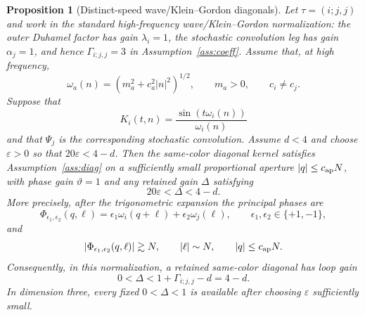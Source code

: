 \documentclass[11pt,reqno]{amsart}
\numberwithin{equation}{section}
\theoremstyle{plain}
\newtheorem{proposition}[theorem]{Proposition}
\theoremstyle{definition}
\newcommand{\eps}{\varepsilon}
\begin{document}
\begin{proposition}[Distinct-speed wave/Klein--Gordon diagonals]\label{prop:wave-verification}
Let \(\tau=(i;j,j)\) and work in the standard high-frequency wave/Klein--Gordon normalization: the outer Duhamel factor has gain \(\lambda_i=1\), the stochastic convolution leg has gain \(\alpha_j=1\), and hence \(\Gamma_{i;j,j}=3\) in Assumption~\ref{ass:coeff}.  Assume that, at high frequency,
\[
        \omega_a(n)=(m_a^2+c_a^2|n|^2)^{1/2},
        \qquad m_a>0,
        \qquad c_i\ne c_j .
\]
Suppose that
\[
        K_i(t,n)=\frac{\sin(t\omega_i(n))}{\omega_i(n)}
\]
and that \(\Psi_j\) is the corresponding stochastic convolution.  Assume
\(d<4\) and choose \(\eps>0\) so that \(20\eps<4-d\).  Then the same-color
diagonal kernel satisfies Assumption~\ref{ass:diag} on a sufficiently small
proportional aperture \(|q|\le c_{\rm ap}N\), with phase gain \(\vartheta=1\)
and any retained gain \(\Delta\) satisfying
\[
        20\eps<\Delta<4-d.
\]
More precisely, after the trigonometric expansion the principal phases are
\begin{equation}\label{eq:wave-phases}
        \Phi_{\epsilon_1,\epsilon_2}(q,\ell)
        =\epsilon_1\omega_i(q+\ell)+\epsilon_2\omega_j(\ell),
        \qquad \epsilon_1,\epsilon_2\in\{+1,-1\},
\end{equation}
and
\begin{equation}\label{eq:wave-phase-lower}
        |\Phi_{\epsilon_1,\epsilon_2}(q,\ell)|\gtrsim N,
        \qquad |\ell|\sim N,
        \qquad |q|\le c_{\rm ap}N .
\end{equation}
Consequently, in this normalization, a retained same-color diagonal has loop gain
\begin{equation}\label{eq:wave-loop-gain}
        0<\Delta<1+\Gamma_{i;j,j}-d=4-d.
\end{equation}
In dimension three, every fixed \(0<\Delta<1\) is available after choosing
\(\eps\) sufficiently small.
\end{proposition}
\end{document}
